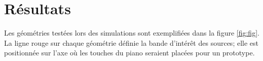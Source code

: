 \documentclass[conference]{IEEEtran}
\begin{document}
\section{Résultats}
Les géométries testées lors des simulations sont exemplifiées dans la figure \ref{fig:fig}. La ligne rouge
sur chaque géométrie définie la bande d'intérêt des sources; elle est positionnée
sur l'axe où les touches du piano seraient placées pour un prototype.
\end{document}
